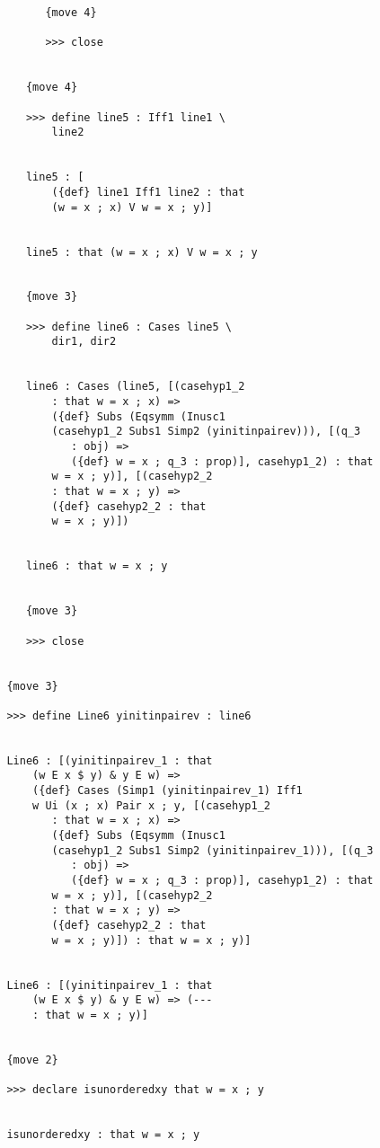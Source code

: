 \documentclass[12pt]{article}
\begin{document}
\begin{verbatim}
               {move 4}

               >>> close


            {move 4}

            >>> define line5 : Iff1 line1 \
                line2


            line5 : [
                ({def} line1 Iff1 line2 : that 
                (w = x ; x) V w = x ; y)]


            line5 : that (w = x ; x) V w = x ; y


            {move 3}

            >>> define line6 : Cases line5 \
                dir1, dir2


            line6 : Cases (line5, [(casehyp1_2 
                : that w = x ; x) => 
                ({def} Subs (Eqsymm (Inusc1 
                (casehyp1_2 Subs1 Simp2 (yinitinpairev))), [(q_3 
                   : obj) => 
                   ({def} w = x ; q_3 : prop)], casehyp1_2) : that 
                w = x ; y)], [(casehyp2_2 
                : that w = x ; y) => 
                ({def} casehyp2_2 : that 
                w = x ; y)])


            line6 : that w = x ; y


            {move 3}

            >>> close


         {move 3}

         >>> define Line6 yinitinpairev : line6


         Line6 : [(yinitinpairev_1 : that 
             (w E x $ y) & y E w) => 
             ({def} Cases (Simp1 (yinitinpairev_1) Iff1 
             w Ui (x ; x) Pair x ; y, [(casehyp1_2 
                : that w = x ; x) => 
                ({def} Subs (Eqsymm (Inusc1 
                (casehyp1_2 Subs1 Simp2 (yinitinpairev_1))), [(q_3 
                   : obj) => 
                   ({def} w = x ; q_3 : prop)], casehyp1_2) : that 
                w = x ; y)], [(casehyp2_2 
                : that w = x ; y) => 
                ({def} casehyp2_2 : that 
                w = x ; y)]) : that w = x ; y)]


         Line6 : [(yinitinpairev_1 : that 
             (w E x $ y) & y E w) => (--- 
             : that w = x ; y)]


         {move 2}

         >>> declare isunorderedxy that w = x ; y


         isunorderedxy : that w = x ; y



\end{verbatim}
\end{document}
